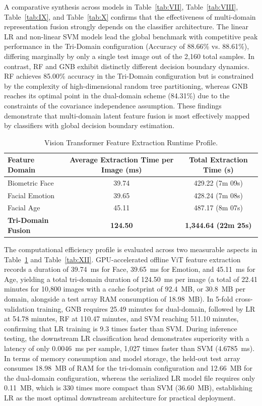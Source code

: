 A comparative synthesis across models in Table~\ref{tab:VII}, Table~\ref{tab:VIII}, Table~\ref{tab:IX}, and Table~\ref{tab:X} confirms that the effectiveness of multi-domain representation fusion strongly depends on the classifier architecture. The linear LR and non-linear SVM models lead the global benchmark with competitive peak performance in the Tri-Domain configuration (Accuracy of 88.66\% vs. 88.61\%), differing marginally by only a single test image out of the 2,160 total samples. In contrast, RF and GNB exhibit distinctly different decision boundary dynamics. RF achieves 85.00\% accuracy in the Tri-Domain configuration but is constrained by the complexity of high-dimensional random tree partitioning, whereas GNB reaches its optimal point in the dual-domain scheme (84.31\%) due to the constraints of the covariance independence assumption. These findings demonstrate that multi-domain latent feature fusion is most effectively mapped by classifiers with global decision boundary estimation.

\begin{table}[htbp]
\caption{Vision Transformer Feature Extraction Runtime Profile.}
\label{tab:11}
\label{tab:XI}
\centering
\footnotesize
\setlength{\tabcolsep}{6pt}
\begin{tabular}{lcc}
\toprule
\textbf{Feature Domain} & \textbf{Average Extraction Time per Image (ms)} & \textbf{Total Extraction Time (s)} \\
\midrule
Biometric Face & 39.74 & 429.22 (7m 09s) \\
Facial Emotion & 39.65 & 428.24 (7m 08s) \\
Facial Age & 45.11 & 487.17 (8m 07s) \\
\midrule
\textbf{Tri-Domain Fusion} & \textbf{124.50} & \textbf{1,344.64 (22m 25s)} \\
\bottomrule
\end{tabular}
\end{table}

The computational efficiency profile is evaluated across two measurable aspects in Table~\ref{tab:XI} and Table~\ref{tab:XII}. GPU-accelerated offline ViT feature extraction records a duration of 39.74~ms for Face, 39.65~ms for Emotion, and 45.11~ms for Age, yielding a total tri-domain duration of 124.50~ms per image (a total of 22.41 minutes for 10,800 images with a cache footprint of 92.4~MB, or 30.8~MB per domain, alongside a test array RAM consumption of 18.98~MB). In 5-fold cross-validation training, GNB requires 25.49 minutes for dual-domain, followed by LR at 54.78 minutes, RF at 110.47 minutes, and SVM reaching 511.10 minutes, confirming that LR training is 9.3 times faster than SVM. During inference testing, the downstream LR classification head demonstrates superiority with a latency of only 0.0046~ms per sample, 1,027 times faster than SVM (4.6785~ms). In terms of memory consumption and model storage, the held-out test array consumes 18.98~MB of RAM for the tri-domain configuration and 12.66~MB for the dual-domain configuration, whereas the serialized LR model file requires only 0.11~MB, which is 330 times more compact than SVM (36.60~MB), establishing LR as the most optimal downstream architecture for practical deployment.

